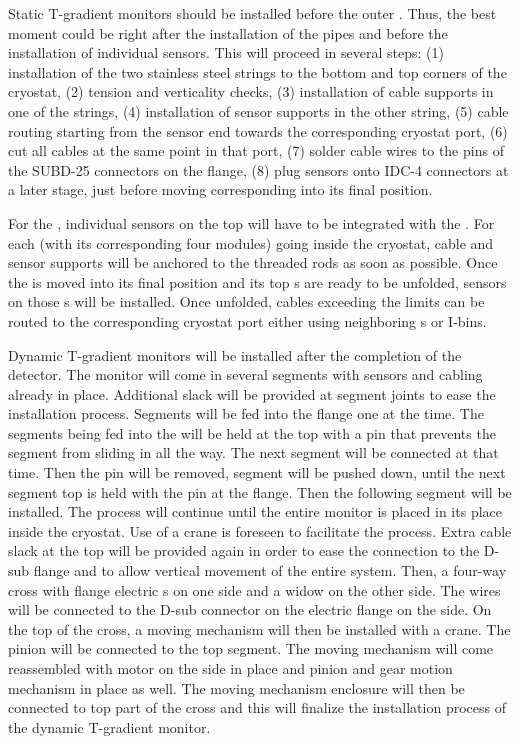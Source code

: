 Static T-gradient monitors should be installed before the outer . Thus, the best moment could be right after the installation of the pipes
and before the installation of individual sensors. This will proceed in several steps: (1) installation of the two stainless steel strings to the bottom and top corners of the cryostat,
(2) tension and verticality checks, (3) installation of cable supports in one of the strings, (4) installation of sensor supports in the other string, (5) cable routing starting from
the sensor end towards the corresponding cryostat port, (6) cut all cables at the same point in that port, (7) solder cable wires to the pins of the SUBD-25 connectors on the flange,
(8) plug sensors onto IDC-4 connectors at a later stage, just before moving corresponding  into its final position. 

For the \single , individual sensors on the top  will have to be integrated with the . For each  (with its corresponding four  modules)
going inside the cryostat, cable and sensor supports will be anchored to the  threaded rods as soon as possible.
Once the  is moved into its final position and its top s are ready to be unfolded, sensors on those s will be installed. Once unfolded, cables 
exceeding the  limits can be routed to the corresponding cryostat port either using neighboring s or  I-bins. 


Dynamic T-gradient monitors will be installed after the completion of the detector.
The monitor will come in several segments with sensors and cabling already
in place. Additional slack will be provided at segment joints to ease the
installation process. Segments will be fed into the flange one at the
time. The segments being fed into the  will be held at the top
with a pin that prevents the segment from sliding in all the way. The next
segment will be connected at that time. Then the pin will be removed,
segment will be pushed down, until the next segment top is held with the
pin at the flange. Then the following segment will be installed. The
process will continue until the entire monitor is placed in its place
inside the cryostat. Use of a crane is foreseen to facilitate the process.
Extra cable slack at the top will be provided again in order to ease  the
connection to the D-sub flange and to allow  vertical movement of the
entire system. Then,  a four-way cross with flange electric \fdth{}s on
one side and a widow on the other side. 
The wires will  be connected to
the D-sub connector on the electric flange \fdth on the side. On the
top of the cross, a moving mechanism will then be installed with a crane.
The pinion will be connected to the top segment. The moving mechanism will
come reassembled with motor on the side in place and pinion and gear
motion mechanism in place as well. The moving mechanism enclosure  will
then be connected to top part of the cross and this will finalize the
installation process of the dynamic T-gradient monitor.


